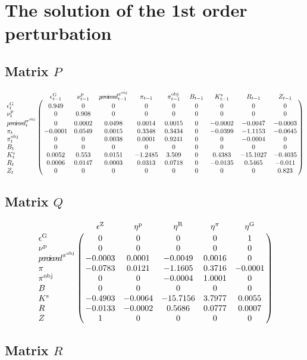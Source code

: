 \section{The solution of the 1st order perturbation}

\subsection*{Matrix $P$}

$$\bordermatrix{
~ & \epsilon^{\mathrm{G}}_{t-1} & \nu^{\mathrm{p}}_{t-1} & {p\!e\!r\!c\!i\!e\!v\!e\!d}^{\pi^{\mathrm{obj}}}_{t-1} & \pi_{t-1} & \pi^{\mathrm{obj}}_{t-1} & B_{t-1} & K^{\mathrm{s}}_{t-1} & R_{t-1} & Z_{t-1} \cr
\epsilon^{\mathrm{G}}_{t} & 0.949 & 0 & 0 & 0 & 0 & 0 & 0 & 0 & 0 \cr
\nu^{\mathrm{p}}_{t} & 0 & 0.908 & 0 & 0 & 0 & 0 & 0 & 0 & 0 \cr
{p\!e\!r\!c\!i\!e\!v\!e\!d}^{\pi^{\mathrm{obj}}}_{t} & 0 & 0.0002 & 0.0498 & 0.0014 & 0.0015 & 0 & -0.0002 & -0.0047 & -0.0003 \cr
\pi_{t} & -0.0001 & 0.0549 & 0.0015 & 0.3348 & 0.3434 & 0 & -0.0399 & -1.1153 & -0.0645 \cr
\pi^{\mathrm{obj}}_{t} & 0 & 0 & 0.0038 & 0.0001 & 0.9241 & 0 & 0 & -0.0004 & 0 \cr
B_{t} & 0 & 0 & 0 & 0 & 0 & 0 & 0 & 0 & 0 \cr
K^{\mathrm{s}}_{t} & 0.0052 & 0.553 & 0.0151 & -1.2485 & 3.509 & 0 & 0.4383 & -15.1027 & -0.4035 \cr
R_{t} & 0.0006 & 0.0147 & 0.0003 & 0.0313 & 0.0718 & 0 & -0.0135 & 0.5465 & -0.011 \cr
Z_{t} & 0 & 0 & 0 & 0 & 0 & 0 & 0 & 0 & 0.823 \cr
}$$

\subsection*{Matrix $Q$}

$$\bordermatrix{
~ & \epsilon^{\mathrm{Z}} & \eta^{\mathrm{p}} & \eta^{\mathrm{R}} & \eta^{\pi} & \eta^{\mathrm{G}} \cr
\epsilon^{\mathrm{G}} & 0 & 0 & 0 & 0 & 1 \cr
\nu^{\mathrm{p}} & 0 & 0 & 0 & 0 & 0 \cr
{p\!e\!r\!c\!i\!e\!v\!e\!d}^{\pi^{\mathrm{obj}}} & -0.0003 & 0.0001 & -0.0049 & 0.0016 & 0 \cr
\pi & -0.0783 & 0.0121 & -1.1605 & 0.3716 & -0.0001 \cr
\pi^{\mathrm{obj}} & 0 & 0 & -0.0004 & 1.0001 & 0 \cr
B & 0 & 0 & 0 & 0 & 0 \cr
K^{\mathrm{s}} & -0.4903 & -0.0064 & -15.7156 & 3.7977 & 0.0055 \cr
R & -0.0133 & -0.0002 & 0.5686 & 0.0777 & 0.0007 \cr
Z & 1 & 0 & 0 & 0 & 0 \cr
}$$

\subsection*{Matrix $R$}

